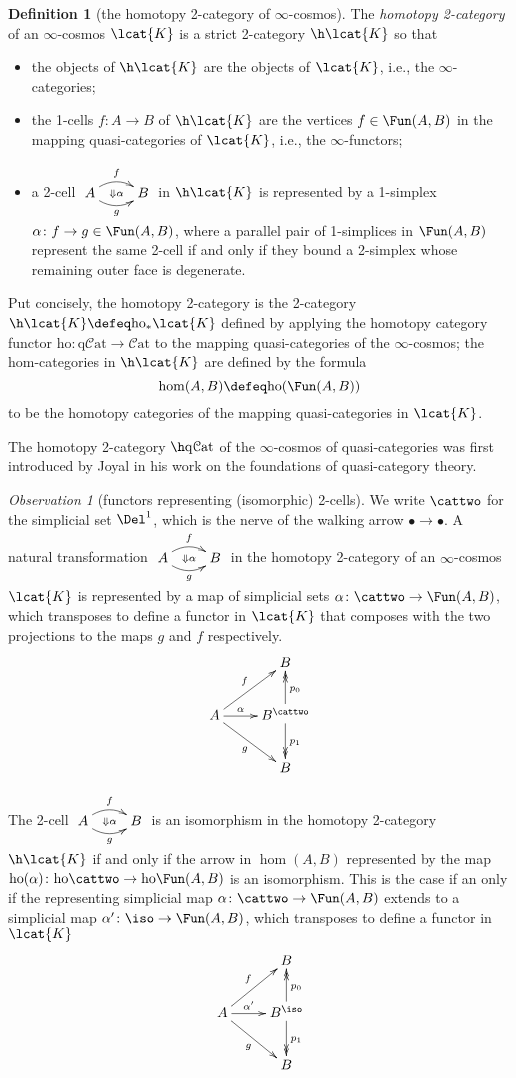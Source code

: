 \documentclass[12pt,reqno]{amsart}
\theoremstyle{plain}
\theoremstyle{definition}
\newtheorem{defn}[thm]{Definition}
\theoremstyle{remark}
\newtheorem{obs}[thm]{Observation}
\numberwithin{equation}{subsection}
\renewcommand{\Cat}{\mathcal{C}\mathrm{at}}
\renewcommand{\qCat}{\mathrm{q}\mathcal{C}\mathrm{at}}
\renewcommand{\ho}{\mathrm{ho}}
\begin{document}
\begin{defn}[the homotopy 2-category of $\infty$-cosmos] The \emph{homotopy 2-category} of an $\infty$-cosmos $\lcat{K}$ is a strict 2-category $\h\lcat{K}$ so that 
\begin{itemize}
\item the objects of $\h\lcat{K}$ are the objects of $\lcat{K}$, i.e., the $\infty$-categories;
\item the 1-cells $f \colon A \to B$ of $\h\lcat{K}$ are the vertices $f \in \Fun(A,B)$ in the mapping quasi-categories of $\lcat{K}$, i.e., the $\infty$-functors;
\item a 2-cell  $\xymatrix{ A \ar@/^2ex/[r]^f \ar@/_2ex/[r]_g \ar@{}[r]|{\Downarrow\alpha}& B}$ in $\h\lcat{K}$ is represented by a 1-simplex $\alpha \colon f \to g \in \Fun(A,B)$, where a parallel pair of 1-simplices in $\Fun(A,B)$ represent the same 2-cell if and only if they bound a 2-simplex whose remaining outer face is degenerate.
\end{itemize}
Put concisely, the homotopy 2-category is the 2-category $\h\lcat{K} \defeq \ho_*\lcat{K}$ defined by applying the homotopy category functor $\ho \colon \qCat \to \Cat$ to the mapping quasi-categories of the $\infty$-cosmos; the hom-categories in $\h\lcat{K}$  are defined by the formula  \[\hom(A,B)\defeq \ho(\Fun(A,B))\] to be the homotopy categories of the mapping quasi-categories in $\lcat{K}$. 
\end{defn}

The homotopy 2-category $\h\qCat$ of the $\infty$-cosmos of quasi-categories was first introduced by Joyal in his work on the foundations of quasi-category theory.

\begin{obs}[functors representing (isomorphic) 2-cells]
We write $\cattwo$ for the simplicial set $\Del^1$, which is the nerve of the walking arrow $\bullet \to \bullet$. A natural transformation $\xymatrix{ A \ar@/^2ex/[r]^f \ar@/_2ex/[r]_g \ar@{}[r]|{\Downarrow\alpha}& B}$ in the homotopy 2-category of an $\infty$-cosmos $\lcat{K}$ is represented by a map of simplicial sets $\alpha \colon \cattwo \to \Fun(A,B)$, which transposes to define a functor in $\lcat{K}$  that composes with the two projections to the maps $g$ and $f$ respectively. 
\[ \xymatrix{ & B \\ A \ar[r]^-{\alpha} \ar[ur]^f \ar[dr]_g & B^\cattwo \ar@{->>}[u]_{p_0} \ar@{->>}[d]^{p_1} \\ & B}\]


The 2-cell $\xymatrix{ A \ar@/^2ex/[r]^f \ar@/_2ex/[r]_g \ar@{}[r]|{\Downarrow\alpha}& B}$ is an isomorphism in the homotopy 2-category $\h\lcat{K}$ if and only if the arrow in $\hom(A,B)$ represented by the map $\ho(\alpha) \colon  \ho\cattwo \to \ho\Fun(A,B)$  is an isomorphism. This is the case if an only if the representing simplicial map $\alpha \colon \cattwo \to \Fun(A,B)$ extends to a simplicial map $\alpha' \colon \iso \to \Fun(A,B)$, which transposes to define a functor in $\lcat{K}$
\[ \xymatrix{ & B \\ A \ar[r]^-{{\alpha}'} \ar[ur]^f \ar[dr]_g &  B^\iso \ar@{->>}[u]_{p_0} \ar@{->>}[d]^{p_1} \\ & B}\]
\end{obs}
\end{document}
